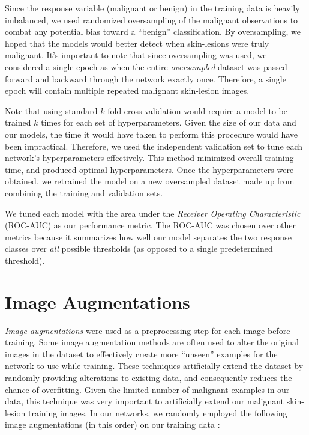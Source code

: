\documentclass [MAS] {uclathes}
\begin{document}
Since the response variable (malignant or benign) in the training data is heavily imbalanced, we used randomized oversampling of the malignant observations to combat any potential bias toward a ``benign'' classification. By oversampling, we hoped that the models would better detect when skin-lesions were truly malignant. It's important to note that since oversampling was used, we considered a single epoch as when the entire \textit{oversampled} dataset was passed forward and backward through the network exactly once. Therefore, a single epoch will contain multiple repeated malignant skin-lesion images.

Note that using standard $k$-fold cross validation would require a model to be trained $k$ times for each set of hyperparameters. Given the size of our data and our models, the time it would have taken to perform this procedure would have been impractical. Therefore, we used the independent validation set to tune each network's hyperparameters effectively. This method minimized overall training time, and produced optimal hyperparameters. Once the hyperparameters were obtained, we retrained the model on a new oversampled dataset made up from combining the training and validation sets.

We tuned each model with the area under the \textit{Receiver Operating Characteristic} (ROC-AUC) as our performance
metric. The ROC-AUC was chosen over other metrics because it summarizes how well our model separates the two response
classes over \textit{all} possible thresholds (as opposed to a single predetermined threshold). 

\section{Image Augmentations}

\textit{Image augmentations} were used as a preprocessing step for each image before training. Some image augmentation methods are often used to alter the original images in the dataset to effectively create more ``unseen'' examples for the network to use while training. These techniques artificially extend the dataset by randomly providing alterations to existing data, and consequently reduces the chance of overfitting. Given the limited number of malignant examples in our data, this technique was very important to artificially extend our malignant skin-lesion training images. In our networks, we randomly employed the following image augmentations (in this order) on our training data \cite{AUG}:
\end{document}
